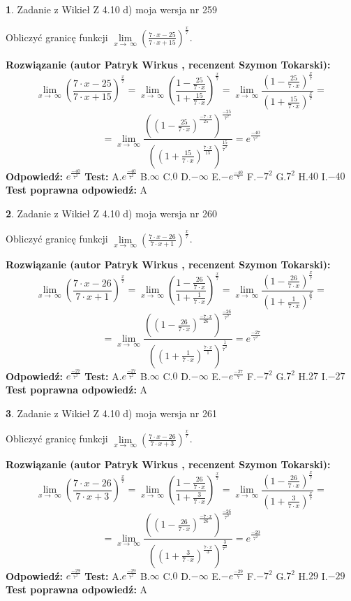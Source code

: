 \documentclass[12pt, a4paper]{article}
\theoremstyle{definition} %
\newtheorem{zad}{}
\newcommand{\zadStart}[1]{\begin{zad}#1\newline}
\newcommand{\zadStop}{\end{zad}}
\newcommand{\rozwStart}[2]{\noindent \textbf{Rozwiązanie (autor #1 , recenzent #2): }\newline}
\newcommand{\rozwStop}{\newline}
\newcommand{\odpStart}{\noindent \textbf{Odpowiedź:}\newline}
\newcommand{\odpStop}{\newline}
\newcommand{\testStart}{\noindent \textbf{Test:}\newline}
\newcommand{\testStop}{\newline}
\newcommand{\kluczStart}{\noindent \textbf{Test poprawna odpowiedź:}\newline}
\newcommand{\kluczStop}{\newline}
\begin{document}
\zadStart{Zadanie z Wikieł Z 4.10 d) moja wersja nr 259}


Obliczyć granicę funkcji  $\lim\limits_{x\to\ \infty}(\frac{7\cdot x-25}{7\cdot x+15})^{\frac{x}{7}}$.
\zadStop
\rozwStart{Patryk Wirkus}{Szymon Tokarski}
$$\lim\limits_{x\to\ \infty}(\frac{7\cdot x-25}{7\cdot x+15})^{\frac{x}{7}} = \lim\limits_{x\to\ \infty}(\frac{1-\frac{25}{7\cdot x}}{1+\frac{15}{7\cdot x}})^{\frac{x}{7}}=\lim\limits_{x\to\ \infty}\frac{(1-\frac{25}{7\cdot x})^{\frac{x}{7}}}{(1+\frac{15}{7\cdot x})^{\frac{x}{7}}}=$$
$$=\lim\limits_{x\to\ \infty}\frac{((1-\frac{25}{7\cdot x})^{\frac{-7\cdot x}{25}})^{\frac{-25}{7^{2}}}}{((1+\frac{15}{7\cdot x})^{\frac{7\cdot x}{15}})^{\frac{15}{7^{2}}}}=e^{\frac{-40}{7^{2}}}$$
\rozwStop
\odpStart
$e^{\frac{-40}{7^{2}}}$
\odpStop
\testStart
A.$e^{\frac{-40}{7^{2}}}$ B.$\infty$ C.$0$ D.$-\infty$ E.$-e^{\frac{-40}{7}}$
F.$-7^{2}$ G.$7^{2}$
H.$40$
I.$-40$
\testStop
\kluczStart
A
\kluczStop



\zadStart{Zadanie z Wikieł Z 4.10 d) moja wersja nr 260}


Obliczyć granicę funkcji  $\lim\limits_{x\to\ \infty}(\frac{7\cdot x-26}{7\cdot x+1})^{\frac{x}{7}}$.
\zadStop
\rozwStart{Patryk Wirkus}{Szymon Tokarski}
$$\lim\limits_{x\to\ \infty}(\frac{7\cdot x-26}{7\cdot x+1})^{\frac{x}{7}} = \lim\limits_{x\to\ \infty}(\frac{1-\frac{26}{7\cdot x}}{1+\frac{1}{7\cdot x}})^{\frac{x}{7}}=\lim\limits_{x\to\ \infty}\frac{(1-\frac{26}{7\cdot x})^{\frac{x}{7}}}{(1+\frac{1}{7\cdot x})^{\frac{x}{7}}}=$$
$$=\lim\limits_{x\to\ \infty}\frac{((1-\frac{26}{7\cdot x})^{\frac{-7\cdot x}{26}})^{\frac{-26}{7^{2}}}}{((1+\frac{1}{7\cdot x})^{\frac{7\cdot x}{1}})^{\frac{1}{7^{2}}}}=e^{\frac{-27}{7^{2}}}$$
\rozwStop
\odpStart
$e^{\frac{-27}{7^{2}}}$
\odpStop
\testStart
A.$e^{\frac{-27}{7^{2}}}$ B.$\infty$ C.$0$ D.$-\infty$ E.$-e^{\frac{-27}{7}}$
F.$-7^{2}$ G.$7^{2}$
H.$27$
I.$-27$
\testStop
\kluczStart
A
\kluczStop



\zadStart{Zadanie z Wikieł Z 4.10 d) moja wersja nr 261}


Obliczyć granicę funkcji  $\lim\limits_{x\to\ \infty}(\frac{7\cdot x-26}{7\cdot x+3})^{\frac{x}{7}}$.
\zadStop
\rozwStart{Patryk Wirkus}{Szymon Tokarski}
$$\lim\limits_{x\to\ \infty}(\frac{7\cdot x-26}{7\cdot x+3})^{\frac{x}{7}} = \lim\limits_{x\to\ \infty}(\frac{1-\frac{26}{7\cdot x}}{1+\frac{3}{7\cdot x}})^{\frac{x}{7}}=\lim\limits_{x\to\ \infty}\frac{(1-\frac{26}{7\cdot x})^{\frac{x}{7}}}{(1+\frac{3}{7\cdot x})^{\frac{x}{7}}}=$$
$$=\lim\limits_{x\to\ \infty}\frac{((1-\frac{26}{7\cdot x})^{\frac{-7\cdot x}{26}})^{\frac{-26}{7^{2}}}}{((1+\frac{3}{7\cdot x})^{\frac{7\cdot x}{3}})^{\frac{3}{7^{2}}}}=e^{\frac{-29}{7^{2}}}$$
\rozwStop
\odpStart
$e^{\frac{-29}{7^{2}}}$
\odpStop
\testStart
A.$e^{\frac{-29}{7^{2}}}$ B.$\infty$ C.$0$ D.$-\infty$ E.$-e^{\frac{-29}{7}}$
F.$-7^{2}$ G.$7^{2}$
H.$29$
I.$-29$
\testStop
\kluczStart
A
\kluczStop
\end{document}
